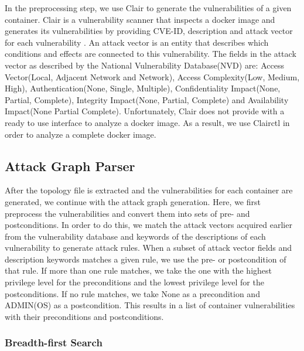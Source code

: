 In the preprocessing step, we use Clair to generate the vulnerabilities of a given container. Clair is a vulnerability scanner that inspects a docker image and generates its vulnerabilities by providing CVE-ID, description and attack vector for each vulnerability \cite{clair}. An attack vector is an entity that describes which conditions and effects are connected to this vulnerability. The fields in the attack vector as described by the National Vulnerability Database(NVD) \cite{booth2013national} are: Access Vector(Local, Adjacent Network and Network), Access Complexity(Low, Medium, High), Authentication(None, Single, Multiple), Confidentiality Impact(None, Partial, Complete), Integrity Impact(None, Partial, Complete) and Availability Impact(None Partial Complete). Unfortunately, Clair does not provide with a ready to use interface to analyze a docker image. As a result, we use Clairctl \cite{clairctl} in order to analyze a complete docker image.


\subsection{Attack Graph Parser}
\label{chap:attack_graph_p}

After the topology file is extracted and the vulnerabilities for each container are generated, we continue with the attack graph generation. Here, we first preprocess the vulnerabilities and convert them into sets of pre- and postconditions. In order to do this, we match the attack vectors acquired earlier from the vulnerability database and keywords of the descriptions of each vulnerability to generate attack rules. When a subset of attack vector fields and description keywords matches a given rule, we use the pre- or postcondition of that rule. If more than one rule matches, we take the one with the highest privilege level for the preconditions and the lowest privilege level for the postconditions. If no rule matches, we take None as a precondition and ADMIN(OS) as a postcondition. This results in a list of container vulnerabilities with their preconditions and postconditions.

\subsubsection{Breadth-first Search}
\label{chap:bfs}

